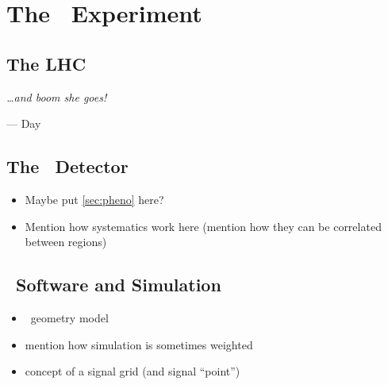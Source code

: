 \chapter{The \atlas\ Experiment}
\section{The LHC}
\epigraph{\emph{\ldots and boom she goes!}}{--- Day}
\section{The \atlas\ Detector}
\begin{itemize}
\item Maybe put \cref{sec:pheno} here?
\item Mention how systematics work here (mention how they can be correlated between regions)
\end{itemize}
\section{\atlas\ Software and Simulation}
\begin{itemize}
\item \atlas\ geometry model
\item mention how simulation is sometimes weighted
\item concept of a signal grid (and signal ``point'')
\end{itemize}
